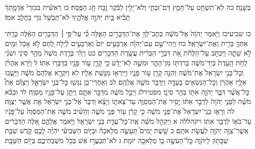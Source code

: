 \documentclass[twoside, openany, parskip=half, 11pt]{book}
\begin{document}
בַּשָּׁנָֽה׃ כה לֹֽא־תִשְׁחַ֥ט עַל־חָמֵ֖ץ דַּם־זִבְחִ֑י וְלֹא־יָלִ֣ין לַבֹּ֔קֶר זֶ֖בַח חַ֥ג הַפָּֽסַח׃ כו רֵאשִׁ֗ית בִּכּוּרֵי֙ אַדְמָ֣תְךָ֔ תָּבִ֕יא בֵּ֖ית יְהֹוָ֣ה אֱלֹהֶ֑יךָ לֹא־תְבַשֵּׁ֥ל גְּדִ֖י בַּחֲלֵ֥ב אִמּֽוֹ׃

כו שביעיכז וַיֹּ֤אמֶר יְהֹוָה֙ אֶל־מֹשֶׁ֔ה כְּתׇב־לְךָ֖ אֶת־הַדְּבָרִ֣ים הָאֵ֑לֶּה כִּ֞י עַל־פִּ֣י ׀ הַדְּבָרִ֣ים הָאֵ֗לֶּה כָּרַ֧תִּי אִתְּךָ֛ בְּרִ֖ית וְאֶת־יִשְׂרָאֵֽל׃ כח וַֽיְהִי־שָׁ֣ם עִם־יְהֹוָ֗ה אַרְבָּעִ֥ים יוֹם֙ וְאַרְבָּעִ֣ים לַ֔יְלָה לֶ֚חֶם לֹ֣א אָכַ֔ל וּמַ֖יִם לֹ֣א שָׁתָ֑ה וַיִּכְתֹּ֣ב עַל־הַלֻּחֹ֗ת אֵ֚ת דִּבְרֵ֣י הַבְּרִ֔ית עֲשֶׂ֖רֶת הַדְּבָרִֽים׃ כט וַיְהִ֗י בְּרֶ֤דֶת מֹשֶׁה֙ מֵהַ֣ר סִינַ֔י וּשְׁנֵ֨י לֻחֹ֤ת הָֽעֵדֻת֙ בְּיַד־מֹשֶׁ֔ה בְּרִדְתּ֖וֹ מִן־הָהָ֑ר וּמֹשֶׁ֣ה לֹֽא־יָדַ֗ע כִּ֥י קָרַ֛ן ע֥וֹר פָּנָ֖יו בְּדַבְּר֥וֹ אִתּֽוֹ׃ ל וַיַּ֨רְא אַהֲרֹ֜ן וְכׇל־בְּנֵ֤י יִשְׂרָאֵל֙ אֶת־מֹשֶׁ֔ה וְהִנֵּ֥ה קָרַ֖ן ע֣וֹר פָּנָ֑יו וַיִּֽירְא֖וּ מִגֶּ֥שֶׁת אֵלָֽיו׃ לא וַיִּקְרָ֤א אֲלֵהֶם֙ מֹשֶׁ֔ה וַיָּשֻׁ֧בוּ אֵלָ֛יו אַהֲרֹ֥ן וְכׇל־הַנְּשִׂאִ֖ים בָּעֵדָ֑ה וַיְדַבֵּ֥ר מֹשֶׁ֖ה אֲלֵהֶֽם׃ לב וְאַחֲרֵי־כֵ֥ן נִגְּשׁ֖וּ כׇּל־בְּנֵ֣י יִשְׂרָאֵ֑ל וַיְצַוֵּ֕ם אֵת֩ כׇּל־אֲשֶׁ֨ר דִּבֶּ֧ר יְהֹוָ֛ה אִתּ֖וֹ בְּהַ֥ר סִינָֽי׃ מפטירלג וַיְכַ֣ל מֹשֶׁ֔ה מִדַּבֵּ֖ר אִתָּ֑ם וַיִּתֵּ֥ן עַל־פָּנָ֖יו מַסְוֶֽה׃ לד וּבְבֹ֨א מֹשֶׁ֜ה לִפְנֵ֤י יְהֹוָה֙ לְדַבֵּ֣ר אִתּ֔וֹ יָסִ֥יר אֶת־הַמַּסְוֶ֖ה עַד־צֵאת֑וֹ וְיָצָ֗א וְדִבֶּר֙ אֶל־בְּנֵ֣י יִשְׂרָאֵ֔ל אֵ֖ת אֲשֶׁ֥ר יְצֻוֶּֽה׃ לה וְרָא֤וּ בְנֵֽי־יִשְׂרָאֵל֙ אֶת־פְּנֵ֣י מֹשֶׁ֔ה כִּ֣י קָרַ֔ן ע֖וֹר פְּנֵ֣י מֹשֶׁ֑ה וְהֵשִׁ֨יב מֹשֶׁ֤ה אֶת־הַמַּסְוֶה֙ עַל־פָּנָ֔יו עַד־בֹּא֖וֹ לְדַבֵּ֥ר אִתּֽוֹ׃
ויקהללה א וַיַּקְהֵ֣ל מֹשֶׁ֗ה אֶֽת־כׇּל־עֲדַ֛ת בְּנֵ֥י יִשְׂרָאֵ֖ל וַיֹּ֣אמֶר אֲלֵהֶ֑ם אֵ֚לֶּה הַדְּבָרִ֔ים אֲשֶׁר־צִוָּ֥ה יְהֹוָ֖ה לַעֲשֹׂ֥ת אֹתָֽם׃ ב שֵׁ֣שֶׁת יָמִים֮ תֵּעָשֶׂ֣ה מְלָאכָה֒ וּבַיּ֣וֹם הַשְּׁבִיעִ֗י יִהְיֶ֨ה לָכֶ֥ם קֹ֛דֶשׁ שַׁבַּ֥ת שַׁבָּת֖וֹן לַיהֹוָ֑ה כׇּל־הָעֹשֶׂ֥ה ב֛וֹ מְלָאכָ֖ה יוּמָֽת׃ ג לֹא־תְבַעֲר֣וּ אֵ֔שׁ בְּכֹ֖ל מֹשְׁבֹֽתֵיכֶ֑ם בְּי֖וֹם הַשַּׁבָּֽת׃
\end{document}
